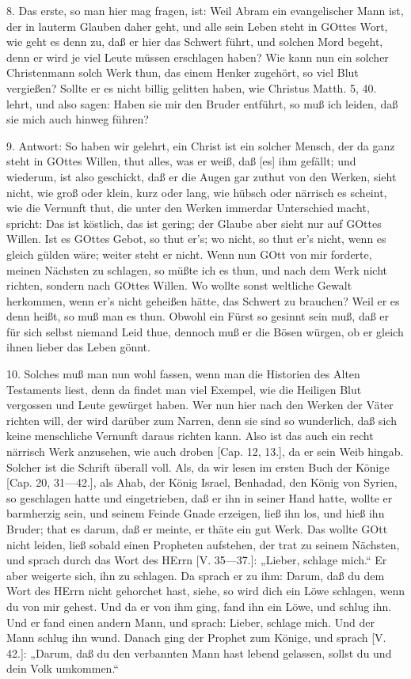8. Das erste, so man hier mag fragen, ist: Weil Abram ein evangelischer Mann ist, der in lauterm Glauben daher geht, und alle sein Leben steht in GOttes Wort, wie geht es denn zu, daß er hier das Schwert führt, und solchen Mord begeht, denn er wird je viel Leute müssen erschlagen haben? Wie kann nun ein solcher Christenmann solch Werk thun, das einem Henker zugehört, so viel Blut vergießen? Sollte er es nicht billig gelitten haben, wie Christus Matth. 5, 40. lehrt, und also sagen: Haben sie mir den Bruder entführt, so muß ich leiden, daß sie mich auch hinweg führen?

9. Antwort: So haben wir gelehrt, ein Christ ist ein solcher Mensch, der da ganz steht in GOttes Willen, thut alles, was er weiß, daß [es] ihm gefällt; und wiederum, ist also geschickt, daß er die Augen gar zuthut von den Werken, sieht nicht, wie groß oder klein, kurz oder lang, wie hübsch oder närrisch es scheint, wie die Vernunft thut, die unter den Werken immerdar Unterschied macht, spricht: Das ist köstlich, das ist gering; der Glaube aber sieht nur auf GOttes Willen. Ist es GOttes Gebot, so thut er’s; wo nicht, so thut er’s nicht, wenn es gleich gülden wäre; weiter steht er nicht. Wenn nun GOtt von mir forderte, meinen Nächsten zu schlagen, so müßte ich es thun, und nach dem Werk nicht richten, sondern nach GOttes Willen. Wo wollte sonst weltliche Gewalt herkommen, wenn er’s nicht geheißen hätte, das Schwert zu brauchen? Weil er es denn heißt, so muß man es thun. Obwohl ein Fürst so gesinnt sein muß, daß er für sich selbst niemand Leid thue, dennoch muß er die Bösen würgen, ob er gleich ihnen lieber das Leben gönnt.

10. Solches muß man nun wohl fassen, wenn man die Historien des Alten Testaments liest, denn da findet man viel Exempel, wie die Heiligen Blut vergossen und Leute gewürget haben. Wer nun hier nach den Werken der Väter richten will, der wird darüber zum Narren, denn sie sind so wunderlich, daß sich keine menschliche Vernunft daraus richten kann. Also ist das auch ein recht närrisch Werk anzusehen, wie auch droben [Cap. 12, 13.], da er sein Weib hingab. Solcher ist die Schrift überall voll. Als, da wir lesen im ersten Buch der Könige [Cap. 20, 31—42.], als Ahab, der König Israel, Benhadad, den König von Syrien, so geschlagen hatte und eingetrieben, daß er ihn in seiner Hand hatte, wollte er barmherzig sein, und seinem Feinde Gnade erzeigen, ließ ihn los, und hieß ihn Bruder; that es darum, daß er meinte, er thäte ein gut Werk. Das wollte GOtt nicht leiden, ließ sobald einen Propheten aufstehen, der trat zu seinem Nächsten, und sprach durch das Wort des HErrn [V. 35—37.]: „Lieber, schlage mich.“ Er aber weigerte sich, ihn zu schlagen. Da sprach er zu ihm: Darum, daß du dem Wort des HErrn nicht gehorchet hast, siehe, so wird dich ein Löwe schlagen, wenn du von mir gehest. Und da er von ihm ging, fand ihn ein Löwe, und schlug ihn. Und er fand einen andern Mann, und sprach: Lieber, schlage mich. Und der Mann schlug ihn wund. Danach ging der Prophet zum Könige, und sprach [V. 42.]: „Darum, daß du den verbannten Mann hast lebend gelassen, sollst du und dein Volk umkommen.“

